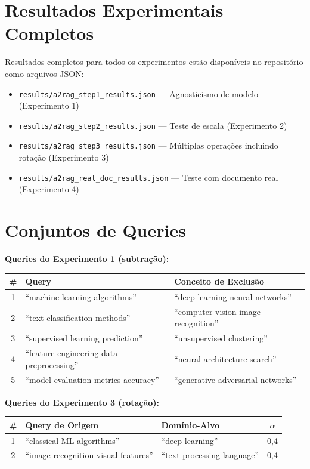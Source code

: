 \documentclass{article}
\begin{document}
\section{Resultados Experimentais Completos}

Resultados completos para todos os experimentos estão disponíveis no repositório como arquivos JSON:

\begin{itemize}
\item \texttt{results/a2rag\_step1\_results.json} --- Agnosticismo de modelo (Experimento 1)
\item \texttt{results/a2rag\_step2\_results.json} --- Teste de escala (Experimento 2)
\item \texttt{results/a2rag\_step3\_results.json} --- Múltiplas operações incluindo rotação (Experimento 3)
\item \texttt{results/a2rag\_real\_doc\_results.json} --- Teste com documento real (Experimento 4)
\end{itemize}

\section{Conjuntos de Queries}

\textbf{Queries do Experimento 1 (subtração):}

\begin{table}[h]
\centering
\begin{tabular}{cll}
\toprule
\# & Query & Conceito de Exclusão \\
\midrule
1 & ``machine learning algorithms'' & ``deep learning neural networks'' \\
2 & ``text classification methods'' & ``computer vision image recognition'' \\
3 & ``supervised learning prediction'' & ``unsupervised clustering'' \\
4 & ``feature engineering data preprocessing'' & ``neural architecture search'' \\
5 & ``model evaluation metrics accuracy'' & ``generative adversarial networks'' \\
\bottomrule
\end{tabular}
\end{table}

\textbf{Queries do Experimento 3 (rotação):}

\begin{table}[h]
\centering
\begin{tabular}{cllc}
\toprule
\# & Query de Origem & Domínio-Alvo & $\alpha$ \\
\midrule
1 & ``classical ML algorithms'' & ``deep learning'' & 0,4 \\
2 & ``image recognition visual features'' & ``text processing language'' & 0,4 \\
\bottomrule
\end{tabular}
\end{table}
\end{document}
